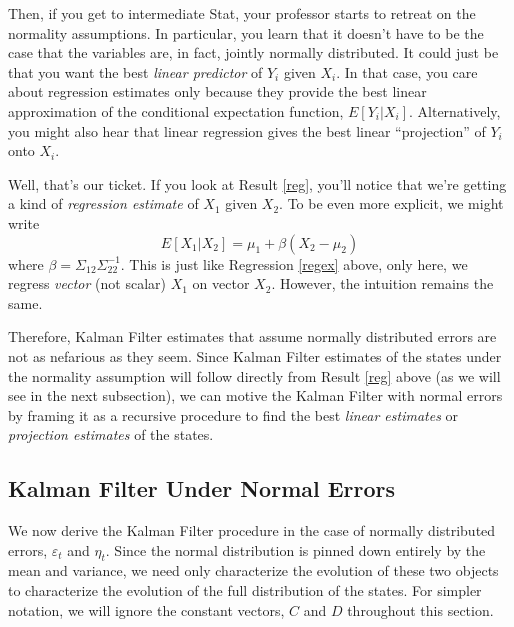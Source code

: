 \documentclass[a4paper,12pt]{article}
\begin{document}
Then, if you get to intermediate Stat, your professor starts to retreat on the normality assumptions. In particular, you learn that it doesn't have to be the case that the variables are, in fact, jointly normally distributed. It could just be that you want the best \emph{linear predictor} of $Y_i$ given $X_i$. In that case, you care about regression estimates only because they provide the best linear approximation of the conditional expectation function, $E[Y_i|X_i]$. Alternatively, you might also hear that linear regression gives the best linear ``projection'' of $Y_i$ onto $X_i$. 

Well, that's our ticket. If you look at Result \ref{reg}, you'll notice that we're getting a kind of \emph{regression estimate} of $X_1$ given $X_2$. To be even more explicit, we might write
\[
  E[X_1|X_2] = \mu_1 + \beta (X_2 - \mu_2) 
\]
where $\beta= \Sigma_{12}\Sigma^{-1}_{22}$. This is just like Regression \ref{regex} above, only here, we regress \emph{vector} (not scalar) $X_1$ on vector $X_2$. However, the intuition remains the same.

Therefore, Kalman Filter estimates that assume normally distributed errors are not as nefarious as they seem. Since Kalman Filter estimates of the states under the normality assumption will follow directly from Result \ref{reg} above (as we will see in the next subsection), we can motive the Kalman Filter with normal errors by framing it as a recursive procedure to find the best \emph{linear estimates} or \emph{projection estimates} of the states. 


\subsection{Kalman Filter Under Normal Errors}

We now derive the Kalman Filter procedure in the case of normally distributed errors, $\varepsilon_t$ and $\eta_t$. Since the normal distribution is pinned down entirely by the mean and variance, we need only characterize the evolution of these two objects to characterize the evolution of the full distribution of the states. For simpler notation, we will ignore the constant vectors, $C$ and $D$ throughout this section.
\end{document}

